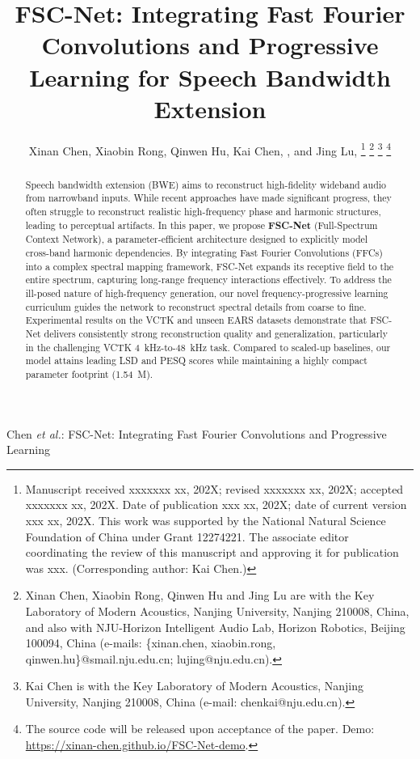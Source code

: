\documentclass[journal]{IEEEtran}
\begin{document}
\title{FSC-Net: Integrating Fast Fourier Convolutions and Progressive Learning for Speech Bandwidth Extension}
\author{Xinan Chen, Xiaobin Rong, Qinwen Hu, Kai Chen, , and Jing Lu, 
\thanks{Manuscript received xxxxxxx xx, 202X; revised xxxxxxx xx, 202X; accepted xxxxxxx xx, 202X. Date of publication xxx xx, 202X; date of current version xxx xx, 202X. This work was supported by the National Natural Science Foundation of China under Grant 12274221. The associate editor coordinating the review of this manuscript and approving it for publication was xxx. (Corresponding author: Kai Chen.)}
\thanks{Xinan Chen, Xiaobin Rong, Qinwen Hu and Jing Lu are with the Key Laboratory of Modern Acoustics, Nanjing University, Nanjing 210008, China, and also with NJU-Horizon Intelligent Audio Lab, Horizon Robotics, Beijing 100094, China (e-mails: \{xinan.chen, xiaobin.rong, qinwen.hu\}@smail.nju.edu.cn; lujing@nju.edu.cn).}
\thanks{Kai Chen is with the Key Laboratory of Modern Acoustics, Nanjing University, Nanjing 210008, China (e-mail: chenkai@nju.edu.cn).}
\thanks{The source code will be released upon acceptance of the paper. Demo: \protect\url{https://xinan-chen.github.io/FSC-Net-demo}.}}

{Chen \MakeLowercase{\textit{et al.}}: FSC-Net: Integrating Fast Fourier Convolutions and Progressive Learning}
\maketitle

\begin{abstract}
Speech bandwidth extension (BWE) aims to reconstruct high-fidelity wideband audio from narrowband inputs. While recent approaches have made significant progress, they often struggle to reconstruct realistic high-frequency phase and harmonic structures, leading to perceptual artifacts. In this paper, we propose \textbf{FSC-Net} (Full-Spectrum Context Network), a parameter-efficient architecture designed to explicitly model cross-band harmonic dependencies. By integrating Fast Fourier Convolutions (FFCs) into a complex spectral mapping framework, FSC-Net expands its receptive field to the entire spectrum, capturing long-range frequency interactions effectively. To address the ill-posed nature of high-frequency generation, our novel frequency-progressive learning curriculum guides the network to reconstruct spectral details from coarse to fine. Experimental results on the VCTK and unseen EARS datasets demonstrate that FSC-Net delivers consistently strong reconstruction quality and generalization, particularly in the challenging VCTK 4~kHz-to-48~kHz task. Compared to scaled-up baselines, our model attains leading LSD and PESQ scores while maintaining a highly compact parameter footprint (1.54~M).
\end{abstract}
\end{document}
